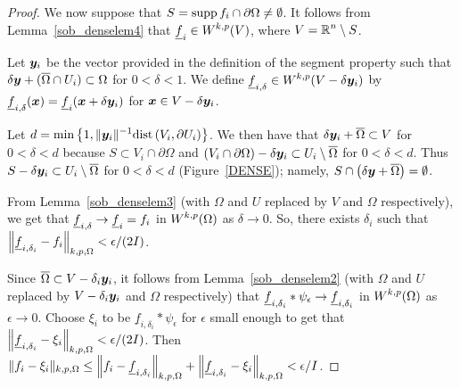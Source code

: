 \begin{proof}
We now suppose that $S = \operatorname{supp} f_i \cap \partial \Omega \neq \emptyset$.
It follows from Lemma~\ref{sob_denselem4} that
$\displaystyle \underline{f}_i \in W^{k,p}(V)$, where
$\displaystyle V = \mathbb{R}^n \setminus S$.

Let ${\bm{y}}_i$ be the vector provided in the definition of the segment property
such that\\
$\delta {\bm{y}} + (\overline{\Omega} \cap U_i) \subset \Omega$
for $0 < \delta < 1$.  We define
$\displaystyle \underline{f}_{i,\delta} \in W^{k,p}(V-\delta {\bm{y}}_i)$ by
$\underline{f}_{i,\delta}({\bm{x}}) = \underline{f}_i({\bm{x}} + \delta {\bm{y}}_i)$
for ${\bm{x}} \in V - \delta {\bm{y}}_i$.

Let $\displaystyle d
= \min \left\{ 1 , \|{\bm{y}}_i\|^{-1} \mathrm{dist}\left(V_i,\partial U_i\right) \right\}$.
We then have that $\delta {\bm{y}}_i + \overline{\Omega} \subset V$ for
$0 < \delta < d$ because $S \subset V_i \cap \partial \Omega$ and
$\displaystyle (V_i \cap \partial \Omega) - \delta {\bm{y}}_i
\subset U_i \setminus \overline{\Omega}$ for $0 < \delta < d$.
Thus
$\displaystyle S - \delta {\bm{y}}_i \subset U_i \setminus \overline{\Omega}$ for
$0 < \delta < d$ (Figure~\ref{DENSE}); namely,
$S \cap \left(\delta{\bm{y}} + \overline{\Omega}\right) = \emptyset$.

From Lemma~\ref{sob_denselem3} (with $\Omega$ and $U$ replaced by $V$ and
$\Omega$ respectively), we get that
$\displaystyle \underline{f}_{i,\delta} \to \underline{f}_i = f_i$
in $\displaystyle W^{k,p}(\Omega)$ as $\delta \to 0$.
So, there exists $\delta_i$ such that
$\displaystyle \left\|\underline{f}_{i,\delta_i} - f_i \right\|_{k,p,\Omega}
< \epsilon/(2I)$.

Since $\overline{\Omega} \subset V - \delta_i {\bm{y}}_i$, it follows
from Lemma~\ref{sob_denselem2} (with $\Omega$ and $U$ replaced by
$V-\delta_i {\bm{y}}_i$ and $\Omega$ respectively) that
$\displaystyle \underline{f}_{i,\delta_i} \ast \psi_\epsilon \to
\underline{f}_{i,\delta_i}$ in $\displaystyle W^{k,p}(\Omega)$ 
as $\epsilon \to 0$.  Choose $\xi_i$ to be
$\underline{f}_{i,\delta_i} \ast \psi_\epsilon$
for $\epsilon$ small enough to get that
$\displaystyle \left\|\underline{f}_{i,\delta_i} - \xi_i\right\|_{k,p,\Omega}
< \epsilon/(2I)$.
Then
$\displaystyle \|f_i - \xi_i\|_{k,p,\Omega} \leq
\left\|f_i - \underline{f}_{i,\delta_i} \right\|_{k,p,\Omega}
+ \left\|\underline{f}_{i,\delta_i} - \xi_i\right\|_{k,p,\Omega} < \epsilon/I$.
\end{proof}


